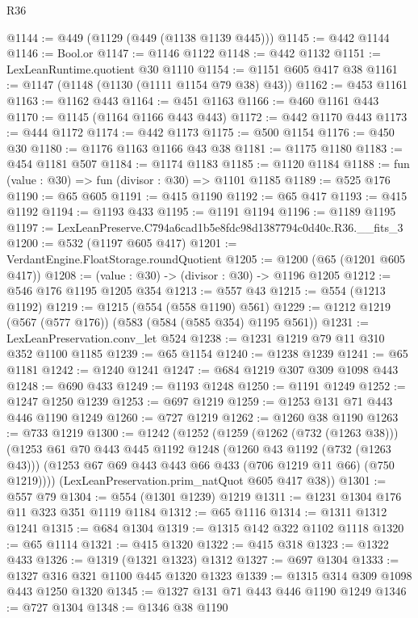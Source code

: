 \begin{lexlean}{R36}
\begin{coremodule}
@1144 := @449 (@1129 (@449 (@1138 @1139 @445)))
@1145 := @442 @1144
@1146 := Bool.or
@1147 := @1146 @1122
@1148 := @442 @1132
@1151 := LexLeanRuntime.quotient @30 @1110
@1154 := @1151 @605 @417 @38
@1161 := @1147 (@1148 (@1130 (@1111 @1154 @79 @38) @43))
@1162 := @453 @1161
@1163 := @1162 @443
@1164 := @451 @1163
@1166 := @460 @1161 @443
@1170 := @1145 (@1164 @1166 @443 @443)
@1172 := @442 @1170 @443
@1173 := @444 @1172
@1174 := @442 @1173
@1175 := @500 @1154
@1176 := @450 @30
@1180 := @1176 @1163 @1166 @43 @38
@1181 := @1175 @1180
@1183 := @454 @1181 @507
@1184 := @1174 @1183
@1185 := @1120 @1184
@1188 := fun (value : @30) => fun (divisor : @30) => @1101 @1185
@1189 := @525 @176
@1190 := @65 @605
@1191 := @415 @1190
@1192 := @65 @417
@1193 := @415 @1192
@1194 := @1193 @433
@1195 := @1191 @1194
@1196 := @1189 @1195
@1197 := LexLeanPreserve.C794a6cad1b5e8fdc98d1387794c0d40c.R36.__fits_3
@1200 := @532 (@1197 @605 @417)
@1201 := VerdantEngine.FloatStorage.roundQuotient
@1205 := @1200 (@65 (@1201 @605 @417))
@1208 := (value : @30) -> (divisor : @30) -> @1196 @1205
@1212 := @546 @176 @1195 @1205 @354
@1213 := @557 @43
@1215 := @554 (@1213 @1192)
@1219 := @1215 (@554 (@558 @1190) @561)
@1229 := @1212 @1219 (@567 (@577 @176)) (@583 (@584 (@585 @354) @1195 @561))
@1231 := LexLeanPreservation.conv_let @524
@1238 := @1231 @1219 @79 @11 @310 @352 @1100 @1185
@1239 := @65 @1154
@1240 := @1238 @1239
@1241 := @65 @1181
@1242 := @1240 @1241
@1247 := @684 @1219 @307 @309 @1098 @443
@1248 := @690 @433
@1249 := @1193 @1248
@1250 := @1191 @1249
@1252 := @1247 @1250 @1239
@1253 := @697 @1219
@1259 := @1253 @131 @71 @443 @446 @1190 @1249
@1260 := @727 @1219
@1262 := @1260 @38 @1190
@1263 := @733 @1219
@1300 := @1242
    (@1252
      (@1259
        (@1262 (@732 (@1263 @38)))
        (@1253
          @61
          @70
          @443
          @445
          @1192
          @1248
          (@1260 @43 @1192 (@732 (@1263 @43)))
          (@1253 @67 @69 @443 @443 @66 @433 (@706 @1219 @11 @66) (@750 @1219))))
      (LexLeanPreservation.prim_natQuot @605 @417 @38))
@1301 := @557 @79
@1304 := @554 (@1301 @1239) @1219
@1311 := @1231 @1304 @176 @11 @323 @351 @1119 @1184
@1312 := @65 @1116
@1314 := @1311 @1312 @1241
@1315 := @684 @1304
@1319 := @1315 @142 @322 @1102 @1118
@1320 := @65 @1114
@1321 := @415 @1320
@1322 := @415 @318
@1323 := @1322 @433
@1326 := @1319 (@1321 @1323) @1312
@1327 := @697 @1304
@1333 := @1327 @316 @321 @1100 @445 @1320 @1323
@1339 := @1315 @314 @309 @1098 @443 @1250 @1320
@1345 := @1327 @131 @71 @443 @446 @1190 @1249
@1346 := @727 @1304
@1348 := @1346 @38 @1190

\end{coremodule}
\end{lexlean}
